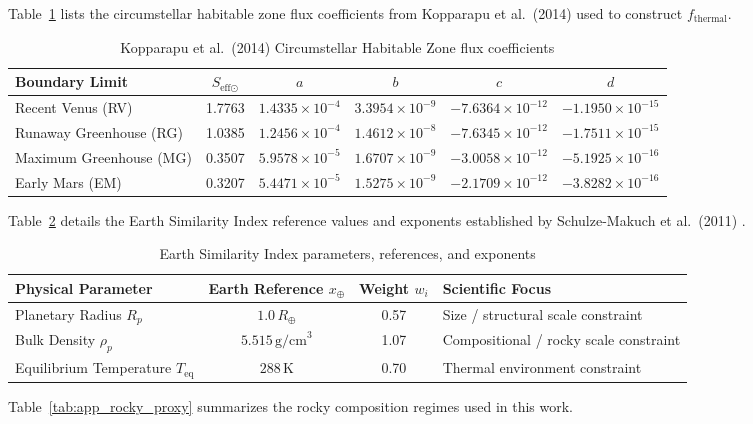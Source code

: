 \documentclass[11pt,a4paper]{article}
\begin{document}
Table~\ref{tab:app_hz_coeffs} lists the circumstellar habitable zone flux coefficients from Kopparapu et al.\ (2014) \cite{kopparapu2014} used to construct $f_{\text{thermal}}$.

\begin{table}[H]
\centering
\caption{Kopparapu et al.\ (2014) Circumstellar Habitable Zone flux coefficients}
\label{tab:app_hz_coeffs}
\begin{tabular}{lccccc}
\toprule
Boundary Limit & $S_{\text{eff}\odot}$ & $a$ & $b$ & $c$ & $d$ \\
\midrule
Recent Venus (RV) & 1.7763 & $1.4335\times10^{-4}$ & $3.3954\times10^{-9}$ & $-7.6364\times10^{-12}$ & $-1.1950\times10^{-15}$ \\
Runaway Greenhouse (RG) & 1.0385 & $1.2456\times10^{-4}$ & $1.4612\times10^{-8}$ & $-7.6345\times10^{-12}$ & $-1.7511\times10^{-15}$ \\
Maximum Greenhouse (MG) & 0.3507 & $5.9578\times10^{-5}$ & $1.6707\times10^{-9}$ & $-3.0058\times10^{-12}$ & $-5.1925\times10^{-16}$ \\
Early Mars (EM) & 0.3207 & $5.4471\times10^{-5}$ & $1.5275\times10^{-9}$ & $-2.1709\times10^{-12}$ & $-3.8282\times10^{-16}$ \\
\bottomrule
\end{tabular}
\end{table}

Table~\ref{tab:app_esi_params} details the Earth Similarity Index reference values and exponents established by Schulze-Makuch et al.\ (2011) \cite{schulze2011}.

\begin{table}[H]
\centering
\caption{Earth Similarity Index parameters, references, and exponents}
\label{tab:app_esi_params}
\begin{tabular}{lccl}
\toprule
Physical Parameter & Earth Reference $x_{\oplus}$ & Weight $w_i$ & Scientific Focus \\
\midrule
Planetary Radius $R_p$ & $1.0\,R_\oplus$ & 0.57 & Size / structural scale constraint \\
Bulk Density $\rho_p$ & $5.515\,\text{g/cm}^3$ & 1.07 & Compositional / rocky scale constraint \\
Equilibrium Temperature $T_{\text{eq}}$ & $288\,\text{K}$ & 0.70 & Thermal environment constraint \\
\bottomrule
\end{tabular}
\end{table}

Table~\ref{tab:app_rocky_proxy} summarizes the rocky composition regimes used in this work.
\end{document}
